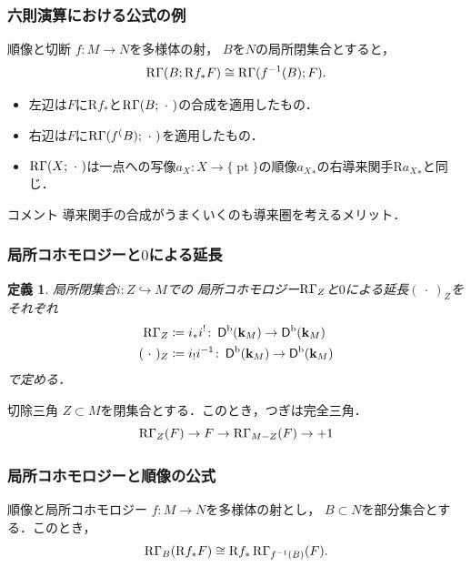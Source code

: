 \documentclass[dvipdfmx,10pt,aspectratio=169,leqno]{beamer}%
\newcommand{\kk}{\mathbf{k}}
\numberwithin{equation}{subsection}
\newcommand{\pt}{\mathop{\mathrm{pt}}\nolimits}
\newcommand{\Dompb}{\mathop{\mathsf{D}^\mathrm{b}}\nolimits}
\newcommand{\RG}{\mathop{\mathrm{R}\hspace{-0pt}\Gamma}\nolimits}
\newcommand{\Rder}{\mathrm{R}}
\newcommand{\blk}{\mathord{\ \cdot\ }}
\theoremstyle{mystyle}
\newtheorem{DFN}[AXM]{定義}
\begin{document}
\begin{frame}
    \frametitle{六則演算における公式の例}
    \begin{exampleblock}{順像と切断}
        \(f\colon M\to N\)を多様体の射，
        \(B\)を\(N\)の局所閉集合とすると，
        \[
            \RG(B;\Rder{f_\ast}F)\cong\RG(f^{-1}(B);F).
        \]
    \end{exampleblock}
    \begin{itemize}
        \item 左辺は\(F\)に\(\Rder{f_\ast}\)と\(\RG(B;\blk)\)の合成を適用したもの．
        \item 右辺は\(F\)に\(\RG(f^(B);\blk)\)を適用したもの．
        \item \(\RG(X;\blk)\)は一点への写像\(
            a_X\colon X\to\{\pt\}
        \)の順像\({a_{X}}_\ast\)の右導来関手\(\Rder{{a_{X}}_\ast}\)と同じ．
    \end{itemize}
    \begin{alertblock}{コメント}
        導来関手の合成がうまくいくのも導来圏を考えるメリット．
    \end{alertblock}
\end{frame}

\begin{frame}
    \frametitle{局所コホモロジーと\(0\)による延長}
    \begin{DFN}
        局所閉集合\(i\colon Z\hookrightarrow M\)での
        局所コホモロジー\(\RG_{Z}\)と\(0\)による延長\((\blk)_Z\)を
        それぞれ\begin{align*}
            \RG_{Z}&\coloneqq i_{\ast}i^{!}\colon \Dompb(\kk_M)\to\Dompb(\kk_M)\\
            (\blk)_Z&\coloneqq i_{!}i^{-1}\colon \Dompb(\kk_M)\to\Dompb(\kk_M)
        \end{align*}
        で定める．
    \end{DFN}
    \begin{exampleblock}{切除三角}
        \(Z\subset M\)を閉集合とする．このとき，つぎは完全三角．
        \[
            \RG_{Z}(F)\to F\to \RG_{M-Z}(F)\to+1
        \]
    \end{exampleblock}
\end{frame}
\begin{frame}
    \frametitle{局所コホモロジーと順像の公式}
    \begin{exampleblock}{順像と局所コホモロジー}
        \(f\colon M\to N\)を多様体の射とし，
        \(B\subset N\)を部分集合とする．このとき，
        \[
            \RG_{B}(\Rder{f_{\ast}}F)
            \cong 
            \Rder{f_{\ast}}\RG_{f^{-1}(B)}(F).
        \]
    \end{exampleblock}
\end{frame}
\end{document}
